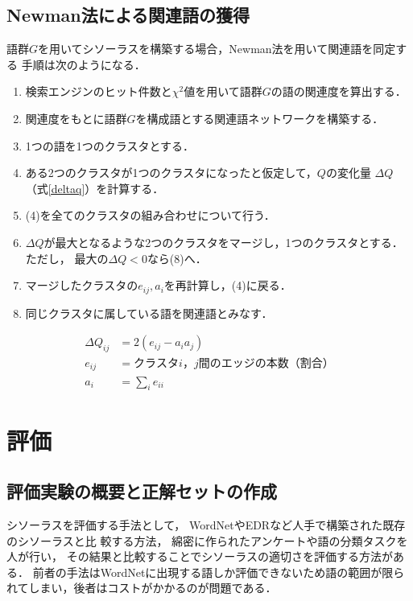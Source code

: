 \documentclass[japanese]{jnlp_1.3a}
\begin{document}
\subsection{Newman法による関連語の獲得}

語群$G$を用いてシソーラスを構築する場合，Newman法を用いて関連語を同定する
手順は次のようになる．

\begin{enumerate}
\item 検索エンジンのヒット件数と$\chi^2$値を用いて語群$G$の語の関連度を算出する．
\item 関連度をもとに語群$G$を構成語とする関連語ネットワークを構築する．
\item 1つの語を1つのクラスタとする．
\item ある2つのクラスタが1つのクラスタになったと仮定して，$Q$の変化量
      $\Delta Q$（式\ref{deltaq}）を計算する．

\item (4)を全てのクラスタの組み合わせについて行う．
\item $\Delta Q$が最大となるような2つのクラスタをマージし，1つのクラスタとする．ただし，
      最大の$\Delta Q<0$なら(8)へ．
\item マージしたクラスタの$e_{ij},a_i$を再計算し，(4)に戻る．
\item 同じクラスタに属している語を関連語とみなす．
\end{enumerate}
\begin{align}
\label{deltaq}
 \Delta Q_{ij} & = 2(e_{ij}-a_i a_j) \nonumber \\
 e_{ij} & = クラスタi，j間のエッジの本数（割合）  \\
 a_i & = \sum_{i} e_{ii} \nonumber 
\end{align}


\section{評価} 


\subsection{評価実験の概要と正解セットの作成}

シソーラスを評価する手法として，
WordNetやEDRなど人手で構築された既存のシソーラスと比
較する方法\cite{Jarmasz03,Curran02}，
綿密に作られたアンケートや語の分類タスクを人が行い，
その結果と比較することでシソーラスの適切さを評価する方法\cite{Croft99,Hodge02}がある．
前者の手法はWordNetに出現する語しか評価できないため語の範囲が限ら
れてしまい，後者はコストがかかるのが問題である．
\end{document}

